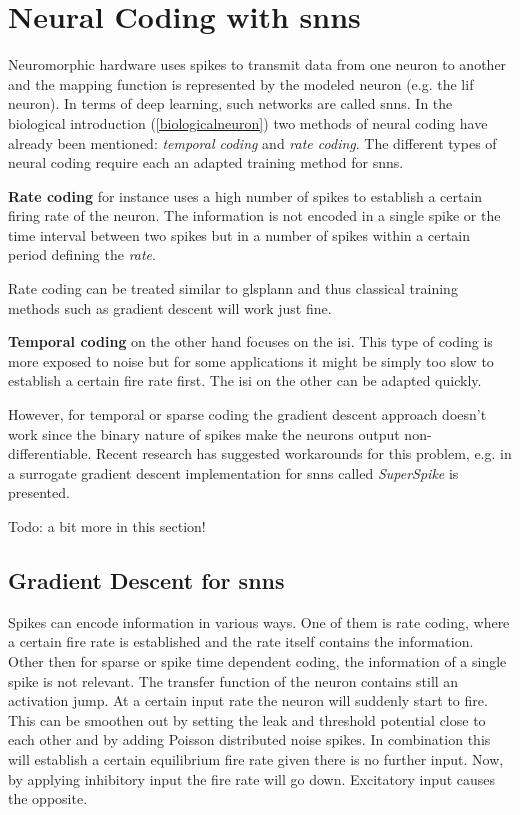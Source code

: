 \section{Neural Coding with \glspl{snn}}
\label{neuralcoding}
Neuromorphic hardware uses spikes to transmit data from one neuron to another and the mapping function is represented by the modeled neuron (e.g. the \gls{lif} neuron). In terms of deep learning, such networks are called \glspl{snn}. In the biological introduction (\cref{biologicalneuron}) two methods of neural coding have already been mentioned: \emph{temporal coding} and \emph{rate coding}. The different types of neural coding require each an adapted training method for \glspl{snn}.

\textbf{Rate coding} for instance uses a high number of spikes to establish a certain firing rate of the neuron. The information is not encoded in a single spike or the time interval between two spikes but in a number of spikes within a certain period defining the \textit{rate}. 

Rate coding can be treated similar to glspl{ann} and thus classical training methods such as gradient descent will work just fine. 

\textbf{Temporal coding} on the other hand focuses on the \gls{isi}. This type of coding is more exposed to noise but for some applications it might be simply too slow to establish a certain fire rate first. The \gls{isi} on the other can be adapted quickly. 

However, for temporal or sparse coding the gradient descent approach doesn't work since the binary nature of spikes make the neurons output non-differentiable. Recent research has suggested workarounds for this problem, e.g. in \cite{zenke2018superspike} a surrogate gradient descent implementation for \glspl{snn} called \emph{SuperSpike} is presented.


Todo: a bit more in this section!



\subsection{Gradient Descent for \glspl{snn}}

Spikes can encode information in various ways. One of them is rate coding, where a certain fire rate is established and the rate itself contains the information. Other then for sparse or spike time dependent coding, the information of a single spike is not relevant. The transfer function of the neuron contains still an activation jump. At a certain input rate the neuron will suddenly start to fire. This can be smoothen out by setting the leak and threshold potential close to each other and by adding Poisson distributed noise spikes. In combination this will establish a certain equilibrium fire rate given there is no further input. Now, by applying inhibitory input the fire rate will go down. Excitatory input causes the opposite.


